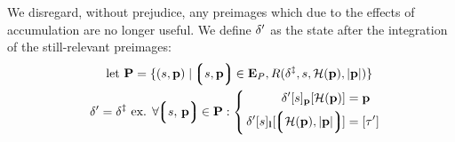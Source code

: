 We disregard, without prejudice, any preimages which due to the effects of accumulation are no longer useful. We define $\delta'$ as the state after the integration of the still-relevant preimages:
\begin{align}
  \using \mathbf{P} = \{
    (s, \mathbf{p})
    \mid
      \tup{s, \mathbf{p}} \in \xtpreimages, R(\accountspostxfer, s, \mathcal{H}(\mathbf{p}), |\mathbf{p}|)
    \}\\
  \accountspostpreimage = \accountspostxfer \text{ ex. } \forall \tup{s\ts\mathbf{p}} \in \mathbf{P} : \left\{\,\begin{aligned}
      \quad\accountspostpreimage[s]_\mathbf{p}[\mathcal{H}(\mathbf{p})] &= \mathbf{p} \\
      \accountspostpreimage[s]_\mathbf{l}[\tup{\mathcal{H}(\mathbf{p}), |\mathbf{p}|}] &= [\tau']
    \end{aligned}\right.\!\!\!\!
\end{align}
